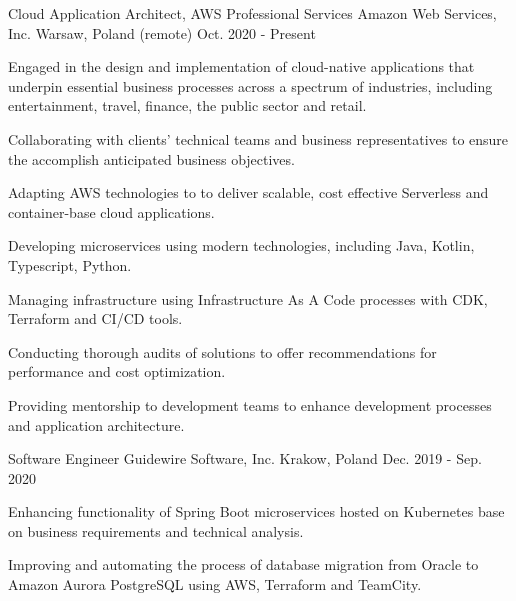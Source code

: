 

\begin{cventries}


  \cventry
    {Cloud Application Architect, AWS Professional Services} %
    {Amazon Web Services, Inc.} %
    {Warsaw, Poland (remote)} %
    {Oct. 2020 - Present} %
    {
      \begin{cvitems} %
       \item {Engaged in the design and implementation of cloud-native applications that underpin essential business processes across a spectrum of industries, including entertainment, travel, finance, the public sector and retail.}
       \item {Collaborating with clients' technical teams and business representatives to ensure the accomplish anticipated business objectives.}
       \item {Adapting AWS technologies to to deliver scalable, cost effective Serverless and container-base cloud applications.}
       \item {Developing microservices using modern technologies, including Java, Kotlin, Typescript, Python. }
       \item {Managing infrastructure using Infrastructure As A Code processes with CDK, Terraform and CI/CD tools.}
       \item {Conducting thorough audits of solutions to offer recommendations for performance and cost optimization.}
       \item {Providing mentorship to development teams to enhance development processes and application architecture.}
      \end{cvitems}
    }

  \cventry
    {Software Engineer} %
    {Guidewire Software, Inc.} %
    {Krakow, Poland} %
    {Dec. 2019 - Sep. 2020} %
    {
      \begin{cvitems} %
       \item {Enhancing functionality of Spring Boot microservices hosted on Kubernetes base on business requirements and technical analysis.}
        \item {Improving and automating the process of database migration from Oracle to Amazon Aurora PostgreSQL using AWS, Terraform and TeamCity.}
      \end{cvitems}
    }


\end{cventries}
